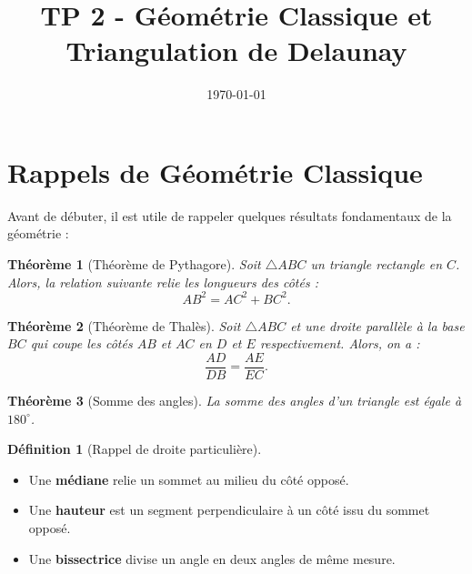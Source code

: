 \documentclass[a4paper,12pt]{article}
\title{TP 2 - Géométrie Classique et Triangulation de Delaunay}
\author{}
\date{\today}
\newtheorem{theorem}{Théorème}[section]
\theoremstyle{definition}
\newtheorem{definition}{Définition}[section]
\begin{document}
\makeonlytitle

\section{Rappels de Géométrie Classique}
\label{sec:rappels_de_g_om_trie_classique}
Avant de débuter, il est utile de rappeler quelques résultats fondamentaux de la géométrie :

\begin{theorem}[Théorème de Pythagore]
Soit \( \triangle ABC \) un triangle rectangle en \(C\). Alors, la relation suivante relie les longueurs des côtés :
\[
AB^2 = AC^2 + BC^2.
\]
\end{theorem}

\begin{theorem}[Théorème de Thalès]
Soit \( \triangle ABC \) et une droite parallèle à la base \(BC\) qui coupe les côtés \(AB\) et \(AC\) en \(D\) et \(E\) respectivement. Alors, on a :
\[
\frac{AD}{DB} = \frac{AE}{EC}.
\]
\]
\end{theorem}

\begin{theorem}[Somme des angles]
La somme des angles d’un triangle est égale à \(180^\circ\).
\end{theorem}

\begin{definition}[Rappel de droite particulière]
\begin{itemize}
  \item Une \textbf{médiane} relie un sommet au milieu du côté opposé.
  \item Une \textbf{hauteur} est un segment perpendiculaire à un côté issu du sommet opposé.
  \item Une \textbf{bissectrice} divise un angle en deux angles de même mesure.
\end{itemize}
\end{definition}





\begin{enumerate}
\end{enumerate}
\end{document}
